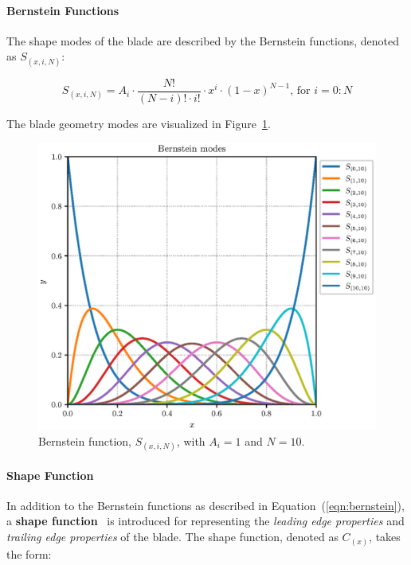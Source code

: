 \paragraph{Bernstein Functions}

The shape modes of the blade are described by the Bernstein functions, denoted as $S_{(x, i, N)}$:

\begin{equation}
  S_{(x, i, N)} = A_i \cdot \frac{N!}{(N - i)! \cdot i!} \cdot x^i \cdot (1 - x)^{N - 1} \text{, for } i = 0:N
  \label{eqn:bernstein}
\end{equation}

The blade geometry modes are visualized in Figure~\ref{fig:bernstein}.

\begin{figure}[!h]
  \centering
  \includegraphics[scale=1]{pyFigure/figures/bernstein.eps}
  \caption{Bernstein function, $S_{(x, i, N)}$, with $A_i = 1$ and $N = 10$.}
  \label{fig:bernstein}
\end{figure}

\paragraph{Shape Function}

In addition to the Bernstein functions as described in Equation~(\ref{eqn:bernstein}), a \textbf{shape function}~\cite{kulfan2010recent} is introduced for representing the \textit{leading edge properties} and \textit{trailing edge properties} of the blade. The shape function, denoted as $C_{(x)}$, takes the form:

